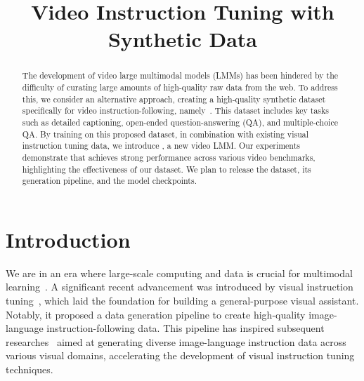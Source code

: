 \title{Video Instruction Tuning with Synthetic Data}



\maketitle

\renewcommand{\thefootnote}{\fnsymbol{footnote}}
\renewcommand{\thefootnote}{\arabic{footnote}}

\begin{abstract}
The development of video large multimodal models (LMMs) has been hindered by the difficulty of curating large amounts of high-quality raw data from the web. To address this, we consider an alternative approach, creating a high-quality synthetic dataset specifically for video instruction-following, namely~\DataName{}. This dataset includes key tasks such as detailed captioning, open-ended question-answering (QA), and multiple-choice QA. By training on this proposed dataset, in combination with existing visual instruction tuning data, we introduce \ModelName{}, a new video LMM. Our experiments demonstrate that \ModelName{} achieves strong performance across various video benchmarks, highlighting the effectiveness of our dataset. We plan to release the dataset, its generation pipeline, and the model checkpoints.
\end{abstract}\section{Introduction}

We are in an era where large-scale computing and data is crucial for multimodal learning~\citep{li2024multimodalsurvey}. A significant recent advancement was introduced by visual instruction tuning~\citep{liu2024visual}, which laid the foundation for building a general-purpose visual assistant. Notably, it proposed a data generation pipeline to create high-quality image-language instruction-following data. This pipeline has inspired subsequent researches~\citep{li2024llavaonevision,li2024llavanext-strong,li2024llavanext-ablations,lin2024vila} aimed at generating diverse image-language instruction data across various visual domains, accelerating the development of visual instruction tuning techniques.

